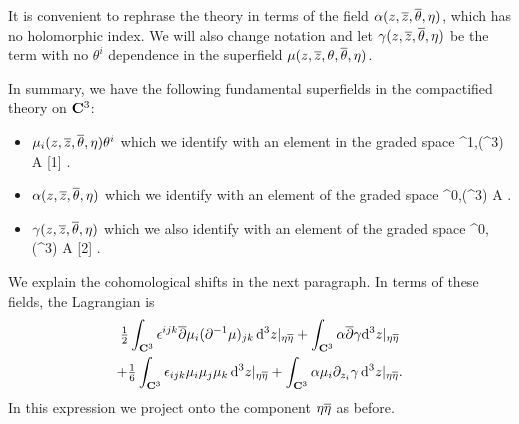 \documentclass[../main.tex]{subfiles}
\begin{document}
It is convenient to rephrase the theory in terms of the field $\alpha(z,{\overline{z}},\overline{\theta},\eta)$, which has no holomorphic index. 
We will also change notation and let $\gamma(z,{\overline{z}},\overline{\theta},\eta)$ be the term with no $\theta^i$ dependence in the superfield $\mu(z,{\overline{z}},\theta,\overline{\theta},\eta)$.  

In summary, we have the following fundamental superfields in the compactified theory on $\mathbf{C}^3$:
\begin{itemize}
\item $\mu_i (z,{\overline{z}},\overline{\theta}, \eta) \theta^i$ which we identify with an element in the graded space
\beqn
\mu \in \PV^{1,\bu}(\C^3) \otimes A [1] .
\eeqn
\item $\alpha (z,{\overline{z}},\overline \theta, \eta)$ which we identify with an element of the graded space
\beqn
\alpha \in \Omega^{0,\bu}(\C^3) \otimes A .
\eeqn
\item $\gamma(z,{\overline{z}},\overline \theta, \eta)$ which we also identify with an element of the graded space
\beqn
\gamma \in \Omega^{0,\bu}(\C^3) \otimes A [2] .
\eeqn
\end{itemize}
We explain the cohomological shifts in the next paragraph.
In terms of these fields, the Lagrangian is
\begin{multline}\label{eqn:K3action}
	\tfrac{1}{2}\int_{\mathbf{C}^{3}}   {\epsilon}^{ijk} \overline{\partial} \mu_{i} (\partial^{-1}  \mu)_{jk} \, \mathrm{d}^3 z |_{\eta \overline \eta}   + \int_{\mathbf{C}^{3}}  \alpha \overline{\partial} \gamma \mathrm{d}^3 z  |_{\eta \overline{\eta}} 
	\\
	+ \tfrac{1}{6} \int_{\mathbf{C}^{3}}  {\epsilon}_{ijk} \mu_{i}\mu_{j} \mu_{k} \, \mathrm{d}^3 z |_{\eta \overline{\eta}} + \int_{\mathbf{C}^{3}}  \alpha \mu_i \partial_{z_i}  \gamma \, \mathrm{d}^3 z|_{\eta \overline{\eta}} .
\end{multline} 
In this expression we project onto the component $\eta \overline \eta$ as before.
\end{document}
